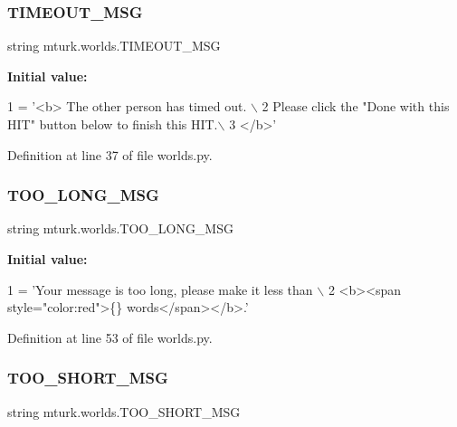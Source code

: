 \subsubsection{\texorpdfstring{T\+I\+M\+E\+O\+U\+T\+\_\+\+M\+SG}{TIMEOUT\_MSG}}
{\footnotesize\ttfamily string mturk.\+worlds.\+T\+I\+M\+E\+O\+U\+T\+\_\+\+M\+SG}

{\bfseries Initial value\+:}
\begin{DoxyCode}
1 =  \textcolor{stringliteral}{'<b> The other person has timed out. \(\backslash\)}
2 \textcolor{stringliteral}{        Please click the "Done with this HIT" button below to finish this HIT.\(\backslash\)}
3 \textcolor{stringliteral}{        </b>'}
\end{DoxyCode}


Definition at line 37 of file worlds.\+py.

\mbox{\label{namespacemturk_1_1worlds_a28e66a25beb7915896e5f4a3cf9c13af}} 
\subsubsection{\texorpdfstring{T\+O\+O\+\_\+\+L\+O\+N\+G\+\_\+\+M\+SG}{TOO\_LONG\_MSG}}
{\footnotesize\ttfamily string mturk.\+worlds.\+T\+O\+O\+\_\+\+L\+O\+N\+G\+\_\+\+M\+SG}

{\bfseries Initial value\+:}
\begin{DoxyCode}
1 =  \textcolor{stringliteral}{'Your message is too long, please make it less than \(\backslash\)}
2 \textcolor{stringliteral}{        <b><span style="color:red">\{\} words</span></b>.'}
\end{DoxyCode}


Definition at line 53 of file worlds.\+py.

\mbox{\label{namespacemturk_1_1worlds_a9225df5e62c99ba7e20902cb4856fd64}} 
\subsubsection{\texorpdfstring{T\+O\+O\+\_\+\+S\+H\+O\+R\+T\+\_\+\+M\+SG}{TOO\_SHORT\_MSG}}
{\footnotesize\ttfamily string mturk.\+worlds.\+T\+O\+O\+\_\+\+S\+H\+O\+R\+T\+\_\+\+M\+SG}

